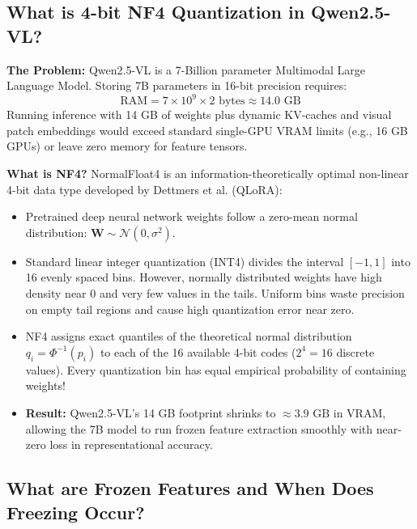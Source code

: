\documentclass[11pt, a4paper]{article}
\begin{document}
\subsection{What is 4-bit NF4 Quantization in Qwen2.5-VL?}

\begin{explainbox}
\textbf{The Problem:} Qwen2.5-VL is a 7-Billion parameter Multimodal Large Language Model. Storing 7B parameters in 16-bit precision requires:
$$\text{RAM} = 7 \times 10^9 \times 2 \text{ bytes} \approx 14.0\text{ GB}$$
Running inference with 14 GB of weights plus dynamic KV-caches and visual patch embeddings would exceed standard single-GPU VRAM limits (e.g., 16 GB GPUs) or leave zero memory for feature tensors.

\textbf{What is NF4?}
NormalFloat4 is an information-theoretically optimal non-linear 4-bit data type developed by Dettmers et al. (QLoRA):
\begin{itemize}[leftmargin=1.2em]
    \item Pretrained deep neural network weights follow a zero-mean normal distribution: $\mathbf{W} \sim \mathcal{N}(0, \sigma^2)$.
    \item Standard linear integer quantization (INT4) divides the interval $[-1, 1]$ into 16 evenly spaced bins. However, normally distributed weights have high density near 0 and very few values in the tails. Uniform bins waste precision on empty tail regions and cause high quantization error near zero.
    \item NF4 assigns exact quantiles of the theoretical normal distribution $q_i = \Phi^{-1}(p_i)$ to each of the 16 available 4-bit codes ($2^4 = 16$ discrete values). Every quantization bin has equal empirical probability of containing weights!
    \item \textbf{Result:} Qwen2.5-VL's 14 GB footprint shrinks to $\approx 3.9\text{ GB}$ in VRAM, allowing the 7B model to run frozen feature extraction smoothly with near-zero loss in representational accuracy.
\end{itemize}
\end{explainbox}

\subsection{What are Frozen Features and When Does Freezing Occur?}
\end{document}
